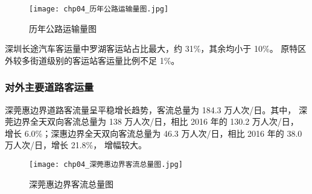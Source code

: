 \begin{figure}[!ht]
  \centering
  \texttt{[image: chp04\_历年公路运输量图.jpg]}
  \caption{历年公路运输量图\label{fig:chp04_历年公路运输量图} }
\end{figure}

深圳长途汽车客运量中罗湖客运站占比最大，约 31\%，其余均小于 10\%。
原特区外较多街道级别的客运站客运量比例不足 1\%。

\subsubsection{对外主要道路客运量}
深莞惠边界道路客流量呈平稳增长趋势，客流总量为 184.3 万人次/日。其中，
深莞边界全天双向客流总量为 138 万人次/日，相比 2016 年的 130.2 万人次/日，
增长 6.0\%；深惠边界全天双向客流总量为 46.3 万人次/日，相比 2016 年的 38.0
万人次/日，增长 21.8\%， 增幅较大。

\begin{figure}[!ht]
  \centering
  \texttt{[image: chp04\_深莞惠边界客流总量图.jpg]}
  \caption{深莞惠边界客流总量图\label{fig:chp04_深莞惠边界客流总量图} }
\end{figure}


